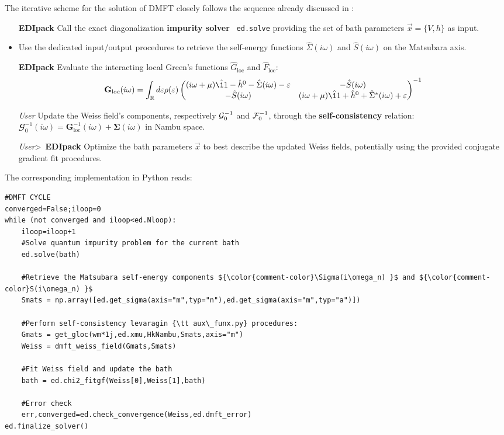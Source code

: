 \documentclass[edipack_sp.tex]{subfiles}
\begin{document}
The iterative scheme for the solution of DMFT closely follows the
sequence already discussed in :   
\begin{itemize}
\item[{\tiny {\bf EDIpack}}] Call the exact diagonalization {\bf impurity solver} {\tt
    ed.solve} providing the set of bath parameters $\vec{x}=\{V,h\}$  as input. 

\item Use the dedicated
  input/output \NAME procedures to retrieve the self-energy functions  
  $\hat{\Sigma}(i\omega)$ and $\hat{S}(i\omega)$ on the 
  Matsubara axis.
  
\item[{\tiny {\bf EDIpack}}]
  Evaluate the interacting local Green's functions $\hat{G}_\mathrm{loc}$ and
  $\hat{F}_\mathrm{loc}$:
  \begin{equation}
  {\mathbf G}_\mathrm{loc}(i\omega) =
  \int_\RRR d\e \rho(\e)
  \begin{pmatrix}
    (i\omega +\mu)\hat{\11} - \hat{h}^0 - \hat{\Sigma}(i\omega) -\e & -\hat{S}(i\omega) \\
    -\hat{S}(i\omega) & (i\omega +\mu)\hat{\11} + \hat{h}^0 +
    \hat{\Sigma}^*(i\omega) +\e\\
  \end{pmatrix}^{-1}
\end{equation}

\item[{\tiny {\it User}}] Update the Weiss field's components, respectively 
  ${\cal G}_0^{-1}$ and ${\cal F}_0^{-1}$, through the {\bf self-con\-sis\-ten\-cy}
  relation: $\mathbfcal{G}^{-1}_0(i\omega) = {\mathbf G}^{-1}_\mathrm{loc}(i\omega) +
  {\mathbf \Sigma}(i\omega)$ in Nambu space.
  
\item[{\tiny {\it User}}\textgreater\ {\tiny {\bf EDIpack}}] Optimize the bath parameters $\vec{x}$ to best describe the updated
    Weiss fields, potentially using the \NAME provided conjugate gradient  fit
    procedures.
  \end{itemize}
%
The corresponding implementation in Python reads:
\begin{lstlisting}[style=mypython,numbers=none,basicstyle={\scriptsize\ttfamily}]
#DMFT CYCLE
converged=False;iloop=0
while (not converged and iloop<ed.Nloop):
    iloop=iloop+1
    #Solve quantum impurity problem for the current bath
    ed.solve(bath)    

    #Retrieve the Matsubara self-energy components ${\color{comment-color}\Sigma(i\omega_n) }$ and ${\color{comment-color}S(i\omega_n) }$
    Smats = np.array([ed.get_sigma(axis="m",typ="n"),ed.get_sigma(axis="m",typ="a")])   
    
    #Perform self-consistency levaragin {\tt aux\_funx.py} procedures:
    Gmats = get_gloc(wm*1j,ed.xmu,HkNambu,Smats,axis="m")
    Weiss = dmft_weiss_field(Gmats,Smats)    
    
    #Fit Weiss field and update the bath
    bath = ed.chi2_fitgf(Weiss[0],Weiss[1],bath)

    #Error check
    err,converged=ed.check_convergence(Weiss,ed.dmft_error)
ed.finalize_solver()
\end{lstlisting}
\end{document}
